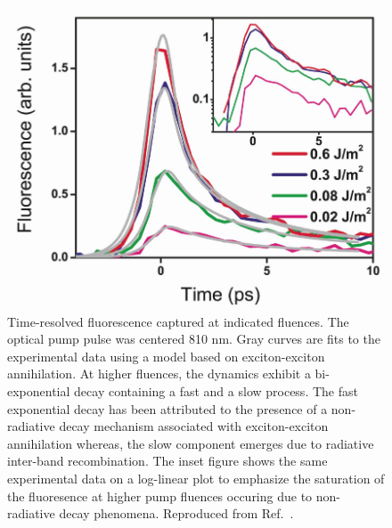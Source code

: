 \begin{figure}[H]
	\centering
	\includegraphics[scale=0.25]{images/chapter_prior_works/fluorescence_wang_2004}
	\caption{Time-resolved fluorescence captured at indicated fluences. The optical pump pulse was centered 810 nm. Gray curves are fits to the experimental data using a model based on exciton-exciton annihilation. At higher fluences, the dynamics exhibit a bi-exponential decay containing a fast and a slow process. The fast exponential decay has been attributed to the presence of a non-radiative decay mechanism associated with exciton-exciton annihilation whereas, the slow component emerges due to radiative inter-band recombination. The inset figure shows the same experimental data on a log-linear plot to emphasize the saturation of the fluoresence at higher pump fluences occuring due to non-radiative decay phenomena. Reproduced from Ref.\ \cite{wang2004observation}.}
	\label{fig:fluorescence_wang_2004}
\end{figure}



